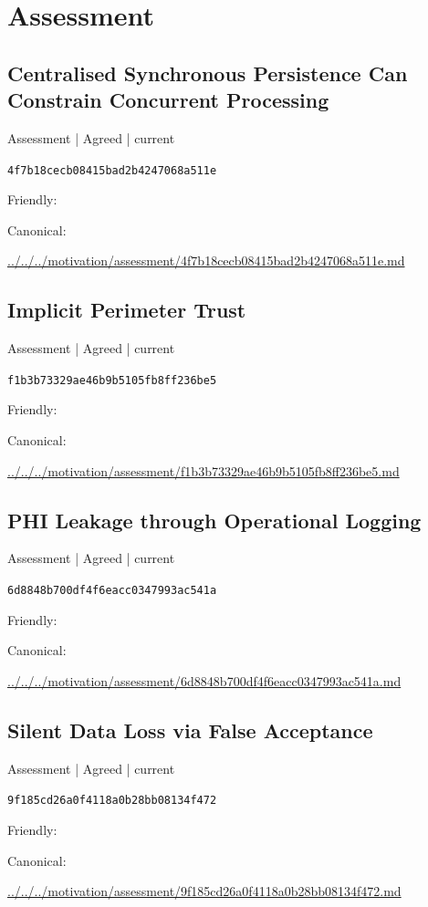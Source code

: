 \documentclass[10pt,a4paper]{article}
\begin{document}
\section*{Assessment}
\subsection*{Centralised Synchronous Persistence Can Constrain Concurrent Processing}
{\small Assessment | Agreed | current}\par
\texttt{4f7b18cecb08415bad2b4247068a511e}\par
Friendly: \par
Canonical: \par
{\footnotesize\url{../../../motivation/assessment/4f7b18cecb08415bad2b4247068a511e.md}}\par
\subsection*{Implicit Perimeter Trust}
{\small Assessment | Agreed | current}\par
\texttt{f1b3b73329ae46b9b5105fb8ff236be5}\par
Friendly: \par
Canonical: \par
{\footnotesize\url{../../../motivation/assessment/f1b3b73329ae46b9b5105fb8ff236be5.md}}\par
\subsection*{PHI Leakage through Operational Logging}
{\small Assessment | Agreed | current}\par
\texttt{6d8848b700df4f6eacc0347993ac541a}\par
Friendly: \par
Canonical: \par
{\footnotesize\url{../../../motivation/assessment/6d8848b700df4f6eacc0347993ac541a.md}}\par
\subsection*{Silent Data Loss via False Acceptance}
{\small Assessment | Agreed | current}\par
\texttt{9f185cd26a0f4118a0b28bb08134f472}\par
Friendly: \par
Canonical: \par
{\footnotesize\url{../../../motivation/assessment/9f185cd26a0f4118a0b28bb08134f472.md}}\par
\end{document}
